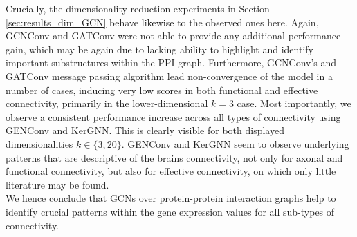 \documentclass[]{article}
\begin{document}
Crucially, the dimensionality reduction experiments in Section \ref{sec:results_dim_GCN} behave likewise to the observed ones here. Again, GCNConv and GATConv were not able to provide any additional performance gain, which may be again due to lacking ability to highlight and identify important substructures within the PPI graph. Furthermore, GCNConv's and GATConv message passing algorithm lead non-convergence of the model in a number of cases, inducing very low scores in both functional and effective connectivity, primarily in the lower-dimensional $k=3$ case. 
Most importantly, we observe a consistent performance increase across all types of connectivity using GENConv and KerGNN. This is clearly visible for both displayed dimensionalities $k\in \{3,20\}$. GENConv and KerGNN seem to observe underlying patterns that are descriptive of the brains connectivity, not only for axonal and functional connectivity, but also for effective connectivity, on which only little literature may be found. \\

We hence conclude that GCNs over protein-protein interaction graphs help to identify crucial patterns within the gene expression values for all sub-types of connectivity. 
\end{document}
